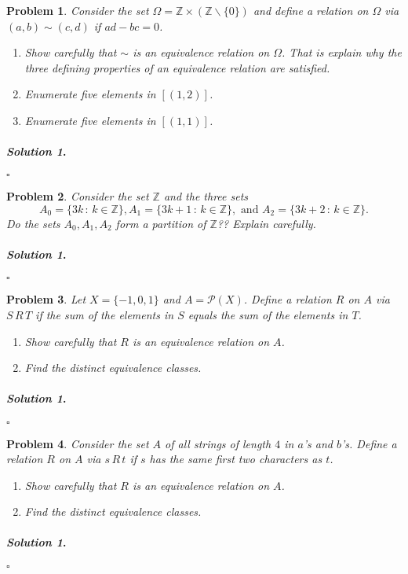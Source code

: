 \documentclass{amsart}
\theoremstyle{plain}
\newtheorem{problem}{Problem}
\newenvironment{solution}{\paragraph{\emph{Solution 1}.}}{\hfill$\square$}
\begin{document}
\begin{problem}
Consider the set $\Omega = \mathbb{Z} \times (\mathbb{Z} \smallsetminus \{ 0\})$ and define a relation on $\Omega$ via $(a,b) \sim (c,d)$ if $ad - bc = 0$.  
\begin{enumerate}
\item Show carefully that $\sim$ is an equivalence relation on $\Omega$.  That is explain why the three defining properties of an equivalence relation are satisfied.
\item Enumerate five elements in $[(1,2)]$.
\item Enumerate five elements in $[(1,1)]$.
\end{enumerate}
\end{problem}
\begin{solution}
\end{solution}

\begin{problem}
Consider the set $\mathbb{Z}$ and the three sets
$$A_{0} = \{3k \, : \, k \in \mathbb{Z} \}, A_{1} = \{3k+1 \, : \, k \in \mathbb{Z} \}, \text{ and }  A_{2} = \{3k+2 \, : \, k \in \mathbb{Z} \}.$$
Do the sets $A_{0}, A_{1}, A_{2}$ form a partition of $\mathbb{Z}$??  Explain carefully.
\end{problem}
\begin{solution}
\end{solution}

\begin{problem}
Let $X = \{ -1,0,1\}$ and $A = \mathcal{P}(X)$.  Define a relation $R$ on $A$ via $S \, R \, T$ if the sum of the elements in $S$ equals the sum of the elements in $T$.
\begin{enumerate}
\item Show carefully that $R$ is an equivalence relation on $A$.
\item Find the distinct equivalence classes.
\end{enumerate}
\end{problem}
\begin{solution}
\end{solution}

\begin{problem}
Consider the set $A$ of all strings of length $4$ in $a$'s and $b$'s.  Define a relation $R$ on $A$ via $s \, R \, t$ if $s$ has the same first two characters as $t$.
\begin{enumerate}
\item Show carefully that $R$ is an equivalence relation on $A$.
\item Find the distinct equivalence classes.
\end{enumerate}
\end{problem}
\begin{solution}
\end{solution}
\end{document}

